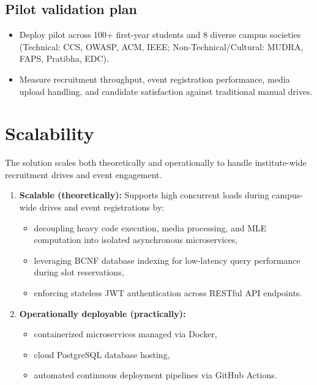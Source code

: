 \documentclass[11pt,a4paper]{article}
\begin{document}
\subsection{Pilot validation plan}
\begin{itemize}[leftmargin=0.7cm]
    \item Deploy pilot across 100+ first-year students and 8 diverse campus societies (Technical: CCS, OWASP, ACM, IEEE; Non-Technical/Cultural: MUDRA, FAPS, Pratibha, EDC).
    \item Measure recruitment throughput, event registration performance, media upload handling, and candidate satisfaction against traditional manual drives.
\end{itemize}

\section{Scalability}
The solution scales both theoretically and operationally to handle institute-wide recruitment drives and event engagement.

\begin{enumerate}[leftmargin=0.7cm]
    \item \textbf{Scalable (theoretically):} Supports high concurrent loads during campus-wide drives and event registrations by:
    \begin{itemize}[leftmargin=0.7cm]
        \item decoupling heavy code execution, media processing, and MLE computation into isolated asynchronous microservices,
        \item leveraging BCNF database indexing for low-latency query performance during slot reservations,
        \item enforcing stateless JWT authentication across RESTful API endpoints.
    \end{itemize}
    
    \item \textbf{Operationally deployable (practically):}
    \begin{itemize}[leftmargin=0.7cm]
        \item containerized microservices managed via Docker,
        \item cloud PostgreSQL database hosting,
        \item automated continuous deployment pipelines via GitHub Actions.
    \end{itemize}
\end{enumerate}
\end{document}
